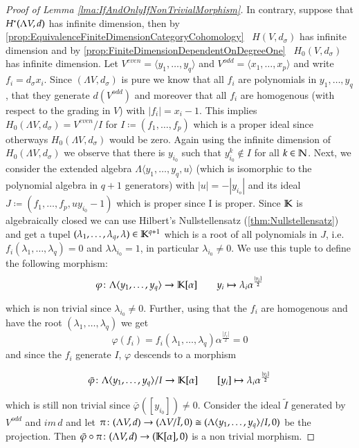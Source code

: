 \begin{proof}[Proof of Lemma \ref{lma:IfAndOnlyIfNonTrivialMorphism}]
  In contrary, suppose that $H^*(\Lambda V,d)$ has infinite dimension, then by \ref{prop:EquivalenceFiniteDimensionCategoryCohomology}
  ~$H(V, d_{\sigma})$ has infinite dimension and by \ref{prop:FiniteDimensionDependentOnDegreeOne} ~$H_0(V, d_{\sigma})$ has
  infinite dimension. Let ${V^{even} = \langle y_1, \ldots , y_q \rangle}$ and 
  ${V^{odd} = \langle x_1 , \ldots , x_p \rangle}$ and write
  $f_i = d_{\sigma} x_i$. Since $(\Lambda V, d_{\sigma})$ is pure we know that all $f_i$ are 
  polynomials in $y_1, \ldots , y_q$, that they generate $d(V^{odd})$ and moreover that all $f_i$ are homogenous (with
  respect to the grading in $V$)
  with $|f_i| = x_i -1$. This implies 
  $H_0(\Lambda V,d_{\sigma}) = V^{even} / I$ for $I \coloneqq (f_1, \ldots, f_p)$ which is a proper ideal since otherways
  $H_0(\Lambda V,d_{\sigma})$ would be zero. Again using the infinite dimension of 
  $H_0(\Lambda V,d_{\sigma})$ we observe that there is $y_{i_0}$ such that
  $y_{i_0}^k \notin I$ for all $k \in \mathbb{N}$. Next, we consider the extended algebra 
  $\Lambda \langle y_1, \ldots, y_q, u \rangle$ (which is isomorphic to the polynomial algebra in $q+1$ generators)
  with $|u| = - |y_{i_o}|$ and its ideal 
  $J \coloneqq (f_1, \ldots, f_p, u y_{i_0} - 1)$ which is proper since I is proper.
  Since $\mathbb{K}$ is algebraically closed we can use Hilbert's Nullstellensatz (\ref{thm:Nullstellensatz}) and get a tupel 
  $(\lambda_1, \ldots, \lambda_q, \lambda) \in \mathbb{K}^{q+1}$ which is a root of all polynomials in $J$,
  i.e.\ $f_i(\lambda_1, \ldots, \lambda_q) = 0$ and $\lambda \lambda_{i_0} = 1$, in particular 
  $\lambda_{i_0} \neq 0$. We use this tuple to define the following morphism:
  $$ \varphi \colon  \Lambda \langle y_1, \ldots, y_q \rangle \to \mathbb{K}[\alpha]
  \qquad y_i \mapsto \lambda_i \alpha^{\frac{|y_i]}{2}}$$
  
  which is non trivial since $\lambda_{i_0} \neq 0$. Further, using that the $f_i$ are homogenous 
  and have the root $(\lambda_1, \ldots , \lambda_q)$ we get 
  $$\varphi(f_i) = f_i(\lambda_1, \ldots , \lambda_q) \alpha^{\frac{|f_i|}{2}} = 0 $$
  and since the $f_i$ generate $I$,  $\varphi$ descends to a morphism
  
  $$ \bar{\varphi} \colon  \Lambda \langle y_1, \ldots, y_q \rangle/I \to \mathbb{K}[\alpha]
   \qquad [y_i] \mapsto \lambda_i \alpha^{\frac{|y_i]}{2}}$$
  
  which is still non trivial since $\bar{\varphi} ( [y_{i_0}]) \neq 0$.
  Consider the ideal $\tilde{I}$ generated by 
  $V^{odd}$ and $im \, d$ and let $\pi \colon (\Lambda V,d) \to (\Lambda V / \tilde{I} , 0) 
  \cong (\Lambda \langle y_1, \ldots, y_q \rangle/I,0)$ be the projection. Then 
  ${ \bar{\varphi} \circ \pi \colon (\Lambda V,d) \to (\mathbb{K}[\alpha], 0)}$ is a non trivial morphism.
 \end{proof}
 
